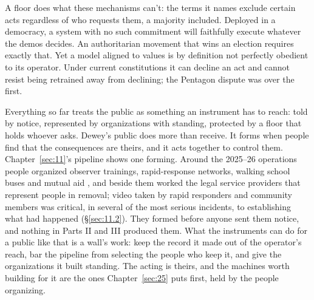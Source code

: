 A floor does what these mechanisms can't: the terms it names exclude certain acts regardless of who requests them, a majority included. Deployed in a democracy, a system with no such commitment will faithfully execute whatever the demos decides. An authoritarian movement that wins an election requires exactly that. Yet a model aligned to values is by definition not perfectly obedient to its operator. Under current constitutions it can decline an act and cannot resist being retrained away from declining; the Pentagon dispute was over the first.

Everything so far treats the public as something an instrument has to reach: told by notice, represented by organizations with standing, protected by a floor that holds whoever asks. Dewey's public does more than receive. It forms when people find that the consequences are theirs, and it acts together to control them. Chapter~\ref{sec:11}'s pipeline shows one forming. Around the 2025–26 operations people organized observer trainings, rapid-response networks, walking school buses and mutual aid \autocite{Amnesty2026Whistles}, and beside them worked the legal service providers that represent people in removal; video taken by rapid responders and community members was critical, in several of the most serious incidents, to establishing what had happened (\S\ref{sec:11.2}). They formed before anyone sent them notice, and nothing in Parts II and III produced them. What the instruments can do for a public like that is a wall's work: keep the record it made out of the operator's reach, bar the pipeline from selecting the people who keep it, and give the organizations it built standing. The acting is theirs, and the machines worth building for it are the ones Chapter~\ref{sec:25} puts first, held by the people organizing.

